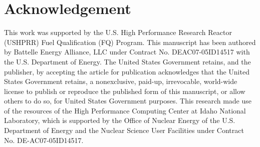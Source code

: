 \documentclass[review]{elsarticle}
\begin{document}
\section{Acknowledgement}
This work was supported by the U.S. High Performance Research Reactor (USHPRR) Fuel Qualification (FQ) Program. This manuscript has been authored by Battelle Energy Alliance, LLC under Contract No. DEAC07-05ID14517 with the U.S. Department of Energy. The United States Government retains, and the publisher, by accepting the article for publication acknowledges that the United States Government retains, a nonexclusive, paid-up, irrevocable, world-wide license to publish or reproduce the published form of this manuscript, or allow others to do so, for United States Government purposes. This research made use of the resources of the High Performance Computing Center at Idaho National Laboratory, which is supported by the Office of Nuclear Energy of the U.S. Department of Energy and the Nuclear Science User Facilities under Contract No. DE-AC07-05ID14517.


\end{document}

